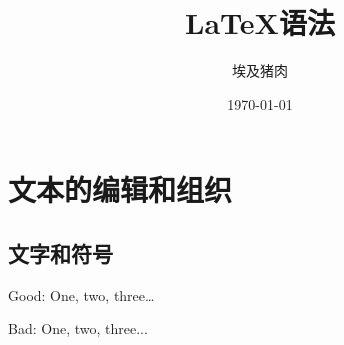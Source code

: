 \documentclass[UTF8]{ctexart}
\title{\LaTeX 语法}
\author{埃及猪肉}
\date{\today}
\begin{document}
\maketitle
\tableofcontents


\section{文本的编辑和组织}

\subsection{文字和符号}



\begin{latexexample}
Good: One, two, three\ldots

Bad: One, two, three...
\end{latexexample}
\end{document}
